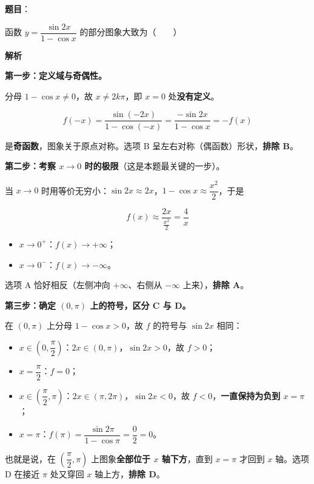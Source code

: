 \begin{answer}

\textbf{题目}：

函数 $y=\dfrac{\sin2x}{1-\cos x}$ 的部分图象大致为\mbox{（　　）}
\nopagebreak[4]
\begin{center}\end{center}
\nopagebreak[4]
\textbf{解析}

\textbf{第一步：定义域与奇偶性。}

分母 $1-\cos x\ne0$，故 $x\ne2k\pi$，即 $x=0$ 处\textbf{没有定义}。

\nopagebreak[4]
\[f(-x)=\frac{\sin(-2x)}{1-\cos(-x)}=\frac{-\sin2x}{1-\cos x}=-f(x)\]

是\textbf{奇函数}，图象关于原点对称。选项 B 呈左右对称（偶函数）形状，\textbf{排除 B}。

\textbf{第二步：考察 $x\to0$ 时的极限}（这是本题最关键的一步）。

当 $x\to0$ 时用等价无穷小：$\sin2x\approx2x$，$1-\cos x\approx\dfrac{x^{2}}2$，于是

\nopagebreak[4]
\[f(x)\approx\frac{2x}{\frac{x^{2}}2}=\frac4x\]

\begin{itemize}
\item $x\to0^{+}$：$f(x)\to+\infty$；
\item $x\to0^{-}$：$f(x)\to-\infty$。
\end{itemize}

选项 A 恰好相反（左侧冲向 $+\infty$、右侧从 $-\infty$ 上来），\textbf{排除 A}。

\textbf{第三步：确定 $(0,\pi)$ 上的符号，区分 C 与 D。}

在 $(0,\pi)$ 上分母 $1-\cos x>0$，故 $f$ 的符号与 $\sin2x$ 相同：

\begin{itemize}
\item $x\in\left(0,\dfrac\pi2\right)$：$2x\in(0,\pi)$，$\sin2x>0$，故 $f>0$；
\item $x=\dfrac\pi2$：$f=0$；
\item $x\in\left(\dfrac\pi2,\pi\right)$：$2x\in(\pi,2\pi)$，$\sin2x<0$，故 $f<0$，\textbf{一直保持为负到 $x=\pi$}；
\item $x=\pi$：$f(\pi)=\dfrac{\sin2\pi}{1-\cos\pi}=\dfrac02=0$。
\end{itemize}

也就是说，在 $\left(\dfrac\pi2,\pi\right)$ 上图象\textbf{全部位于 $x$ 轴下方}，直到 $x=\pi$ 才回到 $x$ 轴。选项 D 在接近 $\pi$ 处又穿回 $x$ 轴上方，\textbf{排除 D}。


\end{answer}
